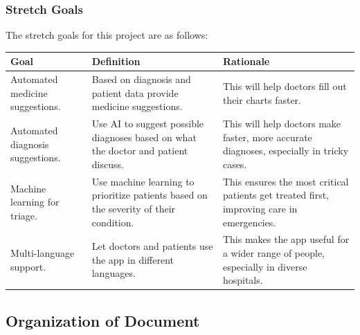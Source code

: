 \documentclass[12pt]{article}
\newcounter{goalnum} %
\begin{document}
\subsubsection{Stretch Goals} \label{sec_StretchGoals}
The stretch goals for this project are as follows:
\begin{table}[H]
    \centering
    \begin{tabular}{p{4cm} p{4cm} p{4cm}}
        \toprule
        \textbf{Goal} & \textbf{Definition} & \textbf{Rationale} \\
        \midrule
        [SG\refstepcounter{stretchgoalnum}\thestretchgoalnum \label{SG_medicineSuggestions}:] Automated medicine suggestions. & Based on diagnosis and patient data provide medicine suggestions. & This will help doctors fill out their charts faster. \\ %
        \midrule
        [SG\refstepcounter{stretchgoalnum}\thestretchgoalnum \label{SG_diagnosisSuggestions}:] Automated diagnosis suggestions.  & Use AI to suggest possible diagnoses based on what the doctor and patient discuss.  & This will help doctors make faster, more accurate diagnoses, especially in tricky cases.\\ 
        \midrule
        [SG\refstepcounter{stretchgoalnum}\thestretchgoalnum \label{SG_triage}:] Machine learning for triage.  & Use machine learning to prioritize patients based on the severity of their condition. & This ensures the most critical patients get treated first, improving care in emergencies. \\
        \midrule 
        [SG\refstepcounter{stretchgoalnum}\thestretchgoalnum \label{SG_multiLanguage}:] Multi-language support. & Let doctors and patients use the app in different languages.  & This makes the app useful for a wider range of people, especially in diverse hospitals. \\
        \bottomrule
    \end{tabular}
\end{table}


\subsection{Organization of Document} \label{sec_OrganizationOfDocument}
\end{document}
